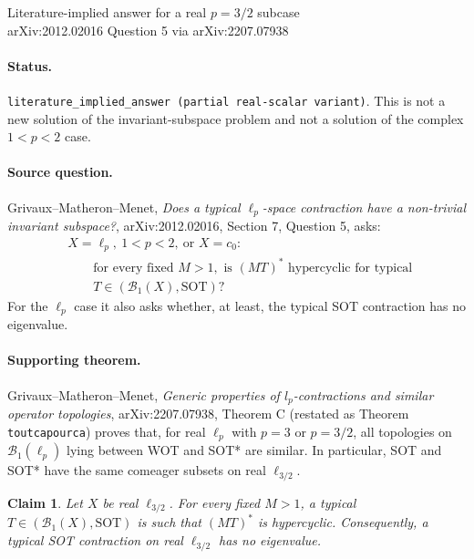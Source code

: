 \documentclass[11pt]{article}
\newtheorem*{claim}{Claim}
\begin{document}
\begin{center}
{\Large Literature-implied answer for a real \(p=3/2\) subcase}\\[4pt]
{\large arXiv:2012.02016 Question 5 via arXiv:2207.07938}
\end{center}

\paragraph{Status.}
\texttt{literature\_implied\_answer (partial real-scalar variant)}. This is not a new solution of the invariant-subspace problem and not a solution of the complex \(1<p<2\) case.

\paragraph{Source question.}
Grivaux--Matheron--Menet, \emph{Does a typical \(\ell_p\)-space contraction have a non-trivial invariant subspace?}, arXiv:2012.02016, Section 7, Question 5, asks:
\begin{align*}
&X=\ell_p,\ 1<p<2,\ \text{or }X=c_0: \\
&\qquad\text{for every fixed }M>1,\text{ is }(MT)^*\text{ hypercyclic for typical }\\
&\qquad T\in(\mathcal B_1(X),\mathrm{SOT})?
\end{align*}
For the \(\ell_p\) case it also asks whether, at least, the typical SOT contraction has no eigenvalue.

\paragraph{Supporting theorem.}
Grivaux--Matheron--Menet, \emph{Generic properties of \(l_p\)-contractions and similar operator topologies}, arXiv:2207.07938, Theorem C (restated as Theorem \texttt{toutcapourca}) proves that, for real \(\ell_p\) with \(p=3\) or \(p=3/2\), all topologies on \(\mathcal B_1(\ell_p)\) lying between WOT and SOT* are similar. In particular, SOT and SOT* have the same comeager subsets on real \(\ell_{3/2}\).

\begin{claim}
Let \(X\) be real \(\ell_{3/2}\). For every fixed \(M>1\), a typical \(T\in(\mathcal B_1(X),\mathrm{SOT})\) is such that \((MT)^*\) is hypercyclic. Consequently, a typical SOT contraction on real \(\ell_{3/2}\) has no eigenvalue.
\end{claim}
\end{document}
